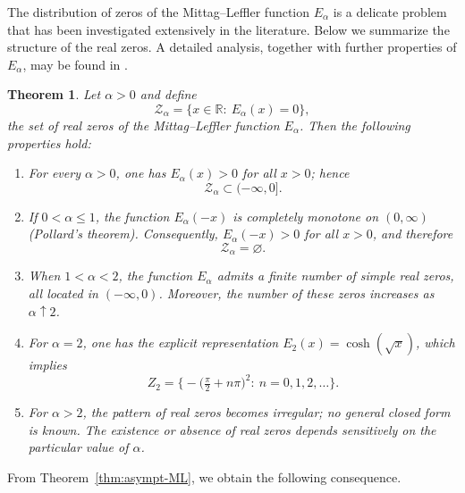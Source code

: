 \documentclass[12pt, reqno]{amsart}
\newtheorem{theorem}{Theorem}[section]
\begin{document}
 The distribution of zeros of the Mittag--Leffler function \(E_{\alpha}\) is a delicate problem that has been investigated extensively in the literature. Below we summarize the structure of the real zeros. A detailed analysis, together with further properties of \(E_{\alpha}\), may be found in \cite{Gorenflo2020,MLF,Pollard,Popov}.
 \begin{theorem}\label{thm:zeros_ML}
Let $\alpha>0$ and define
\begin{equation}
    \label{Z-alpha}
    \mathcal{Z}_\alpha=\Big\{x\in\mathbb{R}:\ E_\alpha(x)=0\Big\},
\end{equation}
the set of real zeros of the Mittag--Leffler function $E_\alpha$. Then the following properties hold:
\begin{enumerate}[label=(\roman*)]
    \item For every $\alpha>0$, one has $E_\alpha(x)>0$ for all $x>0$; hence 
    \[
    \mathcal{Z}_\alpha\subset(-\infty,0].
    \]
    \item If $0<\alpha\le1$, the function $E_\alpha(-x)$ is completely monotone on $(0,\infty)$ (Pollard’s theorem).  
    Consequently, $E_\alpha(-x)>0$ for all $x>0$, and therefore 
    \[
    \mathcal{Z}_\alpha=\varnothing.
    \]
    \item When $1<\alpha<2$, the function $E_\alpha$ admits a finite number of simple real zeros, all located in $(-\infty,0)$.  
    Moreover, the number of these zeros increases as $\alpha\uparrow2$.
    \item For $\alpha=2$, one has the explicit representation $E_2(x)=\cosh(\sqrt{x})$, which implies
    \[
    Z_2=\Big\{-\big(\tfrac{\pi}{2}+n\pi\big)^2:\ n=0,1,2,\dots\Big\}.
    \]
    \item For $\alpha>2$, the pattern of real zeros becomes irregular; no general closed form is known.  
    The existence or absence of real zeros depends sensitively on the particular value of $\alpha$.
\end{enumerate}
\end{theorem}



\medskip



From Theorem~\ref{thm:asympt-ML}, we obtain the following consequence.
\end{document}
